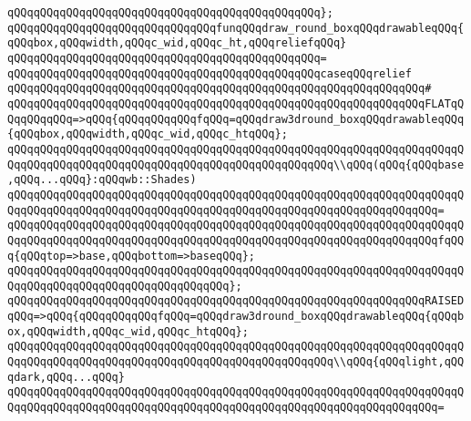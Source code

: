 \verb|qQQqqQQqqQQqqQQqqQQqqQQqqQQqqQQqqQQqqQQqqQQqqQQq};|\newline
\newline
\newline
\verb|qQQqqQQqqQQqqQQqqQQqqQQqqQQqqQQqfunqQQqdraw_round_boxqQQqdrawableqQQq{qQQqbox,qQQqwidth,qQQqc_wid,qQQqc_ht,qQQqreliefqQQq}|\newline
\verb|qQQqqQQqqQQqqQQqqQQqqQQqqQQqqQQqqQQqqQQqqQQqqQQq=|\newline
\verb|qQQqqQQqqQQqqQQqqQQqqQQqqQQqqQQqqQQqqQQqqQQqqQQqcaseqQQqrelief|\newline
\verb|qQQqqQQqqQQqqQQqqQQqqQQqqQQqqQQqqQQqqQQqqQQqqQQqqQQqqQQqqQQqqQQq#|\newline
\verb|qQQqqQQqqQQqqQQqqQQqqQQqqQQqqQQqqQQqqQQqqQQqqQQqqQQqqQQqqQQqqQQqFLATqQQqqQQqqQQq=>qQQq{qQQqqQQqqQQqfqQQq=qQQqdraw3dround_boxqQQqdrawableqQQq{qQQqbox,qQQqwidth,qQQqc_wid,qQQqc_htqQQq};|\newline
\newline
\verb|qQQqqQQqqQQqqQQqqQQqqQQqqQQqqQQqqQQqqQQqqQQqqQQqqQQqqQQqqQQqqQQqqQQqqQQqqQQqqQQqqQQqqQQqqQQqqQQqqQQqqQQqqQQqqQQqqQQqqQQq\\qQQq(qQQq{qQQqbase,qQQq...qQQq}:qQQqwb::Shades)|\newline
\verb|qQQqqQQqqQQqqQQqqQQqqQQqqQQqqQQqqQQqqQQqqQQqqQQqqQQqqQQqqQQqqQQqqQQqqQQqqQQqqQQqqQQqqQQqqQQqqQQqqQQqqQQqqQQqqQQqqQQqqQQqqQQqqQQqqQQqqQQq=|\newline
\verb|qQQqqQQqqQQqqQQqqQQqqQQqqQQqqQQqqQQqqQQqqQQqqQQqqQQqqQQqqQQqqQQqqQQqqQQqqQQqqQQqqQQqqQQqqQQqqQQqqQQqqQQqqQQqqQQqqQQqqQQqqQQqqQQqqQQqqQQqfqQQq{qQQqtop=>base,qQQqbottom=>baseqQQq};|\newline
\verb|qQQqqQQqqQQqqQQqqQQqqQQqqQQqqQQqqQQqqQQqqQQqqQQqqQQqqQQqqQQqqQQqqQQqqQQqqQQqqQQqqQQqqQQqqQQqqQQqqQQqqQQq};|\newline
\newline
\verb|qQQqqQQqqQQqqQQqqQQqqQQqqQQqqQQqqQQqqQQqqQQqqQQqqQQqqQQqqQQqqQQqRAISEDqQQq=>qQQq{qQQqqQQqqQQqfqQQq=qQQqdraw3dround_boxqQQqdrawableqQQq{qQQqbox,qQQqwidth,qQQqc_wid,qQQqc_htqQQq};|\newline
\newline
\verb|qQQqqQQqqQQqqQQqqQQqqQQqqQQqqQQqqQQqqQQqqQQqqQQqqQQqqQQqqQQqqQQqqQQqqQQqqQQqqQQqqQQqqQQqqQQqqQQqqQQqqQQqqQQqqQQqqQQqqQQq\\qQQq{qQQqlight,qQQqdark,qQQq...qQQq}|\newline
\verb|qQQqqQQqqQQqqQQqqQQqqQQqqQQqqQQqqQQqqQQqqQQqqQQqqQQqqQQqqQQqqQQqqQQqqQQqqQQqqQQqqQQqqQQqqQQqqQQqqQQqqQQqqQQqqQQqqQQqqQQqqQQqqQQqqQQqqQQq=|\newline
